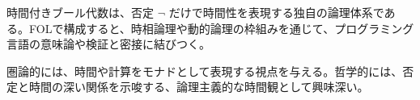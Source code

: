 \documentclass[10pt]{ltjsarticle}
\begin{document}
時間付きブール代数は、否定 $\neg$ だけで時間性を表現する独自の論理体系である。FOLで構成すると、時相論理や動的論理の枠組みを通じて、プログラミング言語の意味論や検証と密接に結びつく。

圏論的には、時間や計算をモナドとして表現する視点を与える。哲学的には、否定と時間の深い関係を示唆する、論理主義的な時間観として興味深い。
\end{document}
